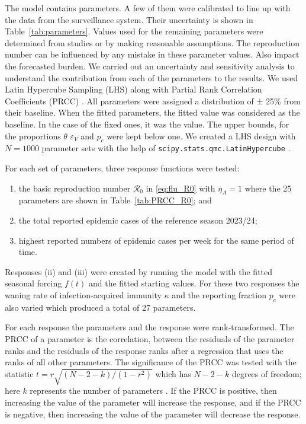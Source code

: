 \documentclass[12pt,a4paper]{article}
\theoremstyle{definition}
\theoremstyle{remark}
\begin{document}
The model contains parameters. A few of them were calibrated to line up with the data from the surveillance system. Their uncertainty is shown in Table~\ref{tab:parameters}. Values used for the remaining parameters were determined from studies or by making reasonable assumptions. The reproduction number can be influenced by any mistake in these parameter values. Also impact the forecasted burden. We carried out an uncertainty and sensitivity analysis to understand the contribution from each of the parameters to the results. We used Latin Hypercube Sampling (LHS) \cite{mckay1979comparison} along with Partial Rank Correlation Coefficients (PRCC) \cite{blower1994sensitivity,marino2008methodology}. All parameters were assigned a distribution of ± 25\% from their baseline. When the fitted parameters, the fitted value was considered as the baseline. In the case of the fixed ones, it was the value. The upper bounds, for the proportions $\theta$ $\varepsilon_V$ and $p_c$ were kept below one. We created a LHS design with $N = 1000$ parameter sets with the help of \texttt{scipy.stats.qmc.LatinHypercube} \cite{virtanen2020scipy}.

For each set of parameters, three response functions were tested:
\begin{enumerate}[label=(\roman*)]
\item the basic reproduction number $\mathcal{R}_0$ in \eqref{eq:flu_R0} with $\eta_A = 1$ where the 25 parameters are shown in Table~\ref{tab:PRCC_R0}; and
\item the total reported epidemic cases of the reference season 2023/24;
\item highest reported numbers of epidemic cases per week for the same period of time.
\end{enumerate}


Responses (ii) and (iii) were created by running the model with the fitted seasonal forcing $f(t)$ and the fitted starting values. For these two responses the waning rate of infection-acquired immunity $\kappa$ and the reporting fraction $p_c$ were also varied which produced a total of 27 parameters.

For each response the parameters and the response were rank‑transformed. The PRCC of a parameter is the correlation, between the residuals of the parameter ranks and the residuals of the response ranks after a regression that uses the ranks of all other parameters. The significance of the PRCC was tested with the statistic $t = r\sqrt{(N-2-k)/(1-r^2)}$ which has $N-2-k$ degrees of freedom; here $k$ represents the number of parameters \cite{marino2008methodology}. If the PRCC is positive, then increasing the value of the parameter will increase the response, and if the PRCC is negative, then increasing the value of the parameter will decrease the response.
\end{document}
